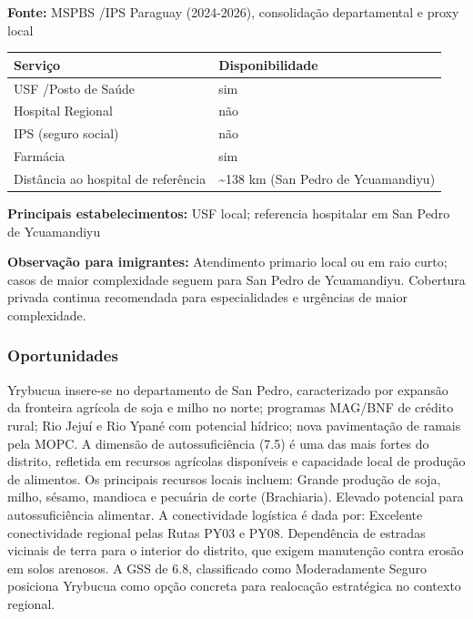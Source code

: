 \textbf{Fonte:} MSPBS /\allowbreak  IPS Paraguay (2024-2026), consolidação
departamental e proxy local

{\def\LTcaptype{none} %
\begin{longtable}[]{@{}
  >{\raggedright\arraybackslash}p{}
  >{\raggedright\arraybackslash}p{}@{}}
\toprule\noalign{}
\begin{minipage}[b]{\linewidth}\raggedright
Serviço
\end{minipage} & \begin{minipage}[b]{\linewidth}\raggedright
Disponibilidade
\end{minipage} \\
\midrule\noalign{}
\endhead
\bottomrule\noalign{}
\endlastfoot
USF /\allowbreak  Posto de Saúde & sim \\
Hospital Regional & não \\
IPS (seguro social) & não \\
Farmácia & sim \\
Distância ao hospital de referência & \textasciitilde138 km (San Pedro
de Ycuamandiyu) \\
\end{longtable}
}

\textbf{Principais estabelecimentos:} USF local; referencia hospitalar
em San Pedro de Ycuamandiyu

\textbf{Observação para imigrantes:} Atendimento primario local ou em
raio curto; casos de maior complexidade seguem para San Pedro de
Ycuamandiyu. Cobertura privada continua recomendada para especialidades
e urgências de maior complexidade.

\subsubsection*{Oportunidades}\label{oport-yrybucua-0219}
Yrybucua insere-se no departamento de San Pedro, caracterizado por expansão da fronteira agrícola de soja e milho no norte; programas MAG/BNF de crédito rural; Rio Jejuí e Rio Ypané com potencial hídrico; nova pavimentação de ramais pela MOPC. A dimensão de autossuficiência (7.5) é uma das mais fortes do distrito, refletida em recursos agrícolas disponíveis e capacidade local de produção de alimentos. Os principais recursos locais incluem: Grande produção de soja, milho, sésamo, mandioca e pecuária de corte (Brachiaria). Elevado potencial para autossuficiência alimentar. A conectividade logística é dada por: Excelente conectividade regional pelas Rutas PY03 e PY08. Dependência de estradas vicinais de terra para o interior do distrito, que exigem manutenção contra erosão em solos arenosos. A GSS de 6.8, classificado como Moderadamente Seguro posiciona Yrybucua como opção concreta para realocação estratégica no contexto regional.

